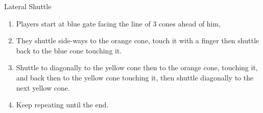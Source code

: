 \begin{oddBlock}{Lateral Shuttle}
\begin{minipage}[t]{\linewidth}
\begin{minipage}{.7\linewidth}
        \begin{enumerate}
            \setlength{\itemsep}{0pt}
            \setlength{\parskip}{0pt}
            \setlength{\parsep}{0pt}
            \item Players start at blue gate facing the line of 3 cones ahead of him,
            \item They shuttle side-ways to the orange cone, touch it with a finger then shuttle back to the blue cone touching it.
            \item Shuttle to diagonally to the yellow cone then to the orange cone, touching it, and back then to the yellow cone touching it, then shuttle diagonally to the next yellow cone.
            \item Keep repeating until the end.
        \end{enumerate}
    \end{minipage}
\end{minipage}
\end{oddBlock}